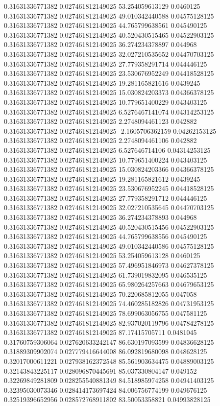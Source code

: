 0.31631336771382 0.027461812149025 53.254059613129 0.0460125
0.31631336771382 0.027461812149025 49.010342440588 0.04575128125
0.31631336771382 0.027461812149025 44.765799638561 0.045490125
0.31631336771382 0.027461812149025 40.520430515465 0.04522903125
0.31631336771382 0.027461812149025 36.274234378897 0.044968
0.31631336771382 0.027461812149025 32.027210535652 0.04470703125
0.31631336771382 0.027461812149025 27.779358291714 0.044446125
0.31631336771382 0.027461812149025 23.530676952249 0.04418528125
0.31631336771382 0.027461812149025 19.281165821616 0.0439245
0.31631336771382 0.027461812149025 15.030824203373 0.04366378125
0.31631336771382 0.027461812149025 10.779651400229 0.043403125
0.31631336771382 0.027461812149025 6.5276467141074 0.04314253125
0.31631336771382 0.027461812149025 2.2748094461123 0.042882
0.31631336771382 0.027461812149025 -2.1605706362159 0.04262153125
0.31631336771382 0.027461812149025 2.2748094461106 0.042882
0.31631336771382 0.027461812149025 6.527646714106 0.04314253125
0.31631336771382 0.027461812149025 10.779651400224 0.043403125
0.31631336771382 0.027461812149025 15.030824203366 0.04366378125
0.31631336771382 0.027461812149025 19.281165821612 0.0439245
0.31631336771382 0.027461812149025 23.530676952245 0.04418528125
0.31631336771382 0.027461812149025 27.779358291712 0.044446125
0.31631336771382 0.027461812149025 32.027210535645 0.04470703125
0.31631336771382 0.027461812149025 36.274234378893 0.044968
0.31631336771382 0.027461812149025 40.520430515456 0.04522903125
0.31631336771382 0.027461812149025 44.765799638556 0.045490125
0.31631336771382 0.027461812149025 49.010342440586 0.04575128125
0.31631336771382 0.027461812149025 53.254059613128 0.0460125
0.31631336771382 0.027461812149025 57.496951846973 0.04627378125
0.31631336771382 0.027461812149025 61.739019832095 0.046535125
0.31631336771382 0.027461812149025 65.980264257663 0.04679653125
0.31631336771382 0.027461812149025 70.220685812055 0.047058
0.31631336771382 0.027461812149025 74.460285182826 0.04731953125
0.31631336771382 0.027461812149025 78.699063056755 0.047581125
0.31631336771382 0.027461812149025 82.937020119796 0.04784278125
0.31631336771382 0.027461812149025 87.17415705711 0.0481045
0.31760759306064 0.027620633242147 86.630197093599 0.04836628125
0.31889309902074 0.027779416644008 86.092819680098 0.048628125
0.32017000611221 0.027938162372548 85.561903634475 0.04889003125
0.32143843225117 0.028096870445691 85.037330804147 0.049152
0.32269849281809 0.028255540881349 84.518985974258 0.04941403125
0.32395030073346 0.028414173697424 84.006756774199 0.049676125
0.32519396652956 0.028572768911802 83.50053358821 0.04993828125
